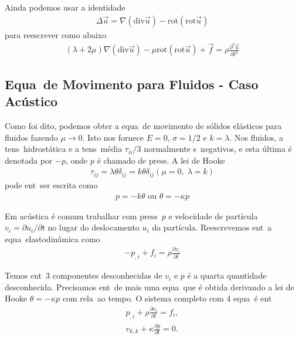 Ainda podemos usar a identidade
\begin{eqnarray}
\Delta\vec{u} = \nabla(\mbox{div}\vec{u}) - \mbox{rot}(\mbox{rot}\vec{u})
\end{eqnarray}
para reescrever como abaixo
\begin{eqnarray}
(\lambda + 2\mu)\nabla(\mbox{div}\vec{u}) - \mu\mbox{rot}(\mbox{rot}\vec{u}) + \vec{f} 
= \rho\frac{\partial^2\vec{u}}{\partial t^2}
\end{eqnarray}

\subsection{Equa\coes\ de Movimento para Fluidos - Caso Ac\'ustico}

Como foi dito, podemos obter a equa\cao\ de movimento de s\'olidos
el\'asticos para fluidos fazendo $\mu \longrightarrow 0$. Isto nos
fornece $E = 0$, $\sigma = 1/2$ e $k = \lambda$. Nos fluidos, a tens\ao\
hidrost\'atica e a tens\ao\ m\'edia $\tau_{ii}/3$ normalmente s\ao\
negativos, e esta \'ultima \'e denotada por $-p$, onde $p$ \'e chamado
de press\ao. A lei de Hooke
\begin{eqnarray}
\tau_{ij} = \lambda\theta\delta_{ij} = k\theta\delta_{ij}  (\mu = 0, \; \lambda = k)
\end{eqnarray}
pode ent\ao\ ser escrita como
\begin{eqnarray}
p = -k\theta \mbox{ ou } \theta = -\kappa p
\end{eqnarray}

Em ac\'ustica \'e comum trabalhar com press\ao\ $p$ e velocidade de
part\'icula $v_i = \partial u_i/\partial t$ no lugar do deslocamento
$u_i$ da part\'icula. Reescrevemos ent\ao\ a equa\cao\ elastodin\^amica
como
\begin{eqnarray}
-p_{,i} + f_i = \rho\frac{\partial v_i}{\partial t}
\end{eqnarray}

Temos ent\ao\ 3 componentes desconhecidas de $v_i$ e $p$ \'e a quarta
quantidade desconhecida. Precisamos ent\ao\ de mais uma equa\cao\ que
\'e obtida derivando a lei de Hooke $\theta = -\kappa p$ com rela\cao\
ao tempo. O sistema completo com 4 equa\coes\ \'e ent\ao
\begin{eqnarray}
p_{,i} + \rho\frac{\partial v_i}{\partial t} = f_i,
\label{eqondpres} \\
v_{k,k} + \kappa\frac{\partial p}{\partial t} = 0 .
\label{eqondvel}
\end{eqnarray}


